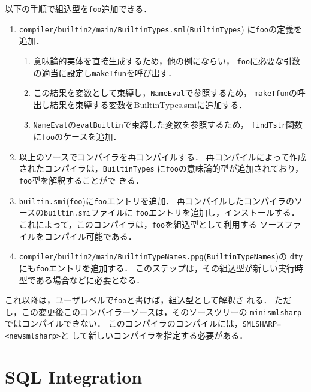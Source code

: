 \documentclass{jbook}
\newcommand{\txt}[2]{#2}
\newcommand{\code}[1]{\mbox{\large\tt #1}}
\newcommand{\module}[2]{\code{#1}(\code{#2})}
\begin{document}
\begin{enumerate}
	以下の手順で組込型を\code{foo}追加できる．
\begin{enumerate}
\item \module{compiler/builtin2/main/BuiltinTypes.sml}{BuiltinTypes}
に\code{foo}の定義を追加．
\begin{enumerate}
\item 意味論的実体を直接生成するため，他の例にならい，
\code{foo}に必要な引数の適当に設定し\code{makeTfun}を呼び出す．
\item この結果を変数として束縛し，\code{NameEval}で参照するため，
\code{makeTfun}の呼出し結果を束縛する変数を{BuiltinTypes.smi}に追加する．
\item \code{NameEval}の\code{evalBuiltin}で束縛した変数を参照するため，
\code{findTstr}関数に\code{foo}のケースを追加．
\end{enumerate}
\item 以上のソースでコンパイラを再コンパイルする．
	再コンパイルによって作成されたコンパイラは，\code{BuiltinTypes}
に\code{foo}の意味論的型が追加されており，\code{foo}型を解釈することがで
きる．
\item \module{builtin.smi}{foo}に\code{foo}エントリを追加．
	再コンパイルしたコンパイラのソースの\code{builtin.smi}ファイルに
\code{foo}エントリを追加し，インストールする．
	これによって，このコンパイラは，\code{foo}を組込型として利用する
ソースファイルをコンパイル可能である．
\item \module{compiler/builtin2/main/BuiltinTypeNames.ppg}{BuiltinTypeNames}の
\code{dty}にも\code{foo}エントリを追加する．
	このステップは，その組込型が新しい実行時型である場合などに必要となる．
\end{enumerate}
	これ以降は，ユーザレベルで\code{foo}と書けば，組込型として解釈さ
れる．
	ただし，この変更後このコンパイラーソースは，そのソースツリーの
\code{minismlsharp}ではコンパイルできない．
	このコンパイラのコンパイルには，\code{SMLSHARP=<newsmlsharp>}と
して新しいコンパイラを指定する必要がある．
\end{enumerate}


\chapter{\txt
{SQL言語の埋め込み}
{SQL Integration}
}
\label{chap:sqlintegration}
\end{document}
